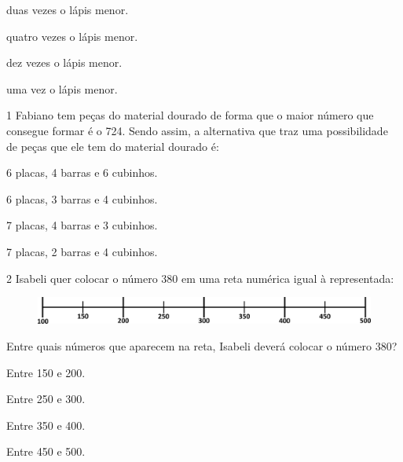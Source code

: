 \begin{escolha}
\item
  duas vezes o lápis menor.
\item
  quatro vezes o lápis menor.
\item
  dez vezes o lápis menor.
\item
  uma vez o lápis menor.
\end{escolha}
\pagebreak

\vspace*{-3.4cm}

\pagebreak
\num{1} Fabiano tem peças do material dourado de forma que o maior número
que consegue formar é o 724. Sendo assim, a alternativa que traz uma
possibilidade de peças que ele tem do material dourado é:

\begin{escolha}
\item
  6 placas, 4 barras e 6 cubinhos.
\item
  6 placas, 3 barras e 4 cubinhos.
\item
  7 placas, 4 barras e 3 cubinhos.
\item
  7 placas, 2 barras e 4 cubinhos.
\end{escolha}

\num{2} Isabeli quer colocar o número 380 em uma reta numérica igual à representada:

\begin{figure}[htpb!]
\centering
\includegraphics[width=\textwidth]{./media/image102.png}
\end{figure}

Entre quais números que aparecem na reta, Isabeli deverá colocar o número 380?

\begin{multicols}{2}
\begin{escolha}
\item
  Entre 150 e 200.
\item
  Entre 250 e 300.
\item
  Entre 350 e 400.
\item
  Entre 450 e 500.
\end{escolha}
\end{multicols}


